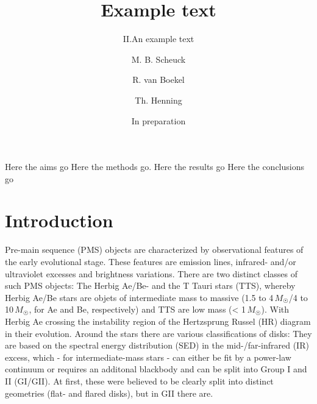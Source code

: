 \documentclass{aa}
\newcommand{\Msun}{\,$M_{\astrosun}$}
\begin{document}
\title{Example text}
\subtitle{II.\@ An example text}
\author{M. B. Scheuck
    \and R. van Boekel
\and Th. Henning}
 \date{In preparation}
\abstract{} {Here the aims go} {Here the methods go.} {Here the results go} {Here the conclusions go}
\maketitle

\section{Introduction}
Pre-main sequence (PMS) objects are characterized by observational features of
the early evolutional stage. These features are emission lines, infrared- and/or
ultraviolet excesses and brightness variations. There are two distinct classes
of such PMS objects: The Herbig Ae/Be- and the T Tauri stars (TTS), whereby
Herbig Ae/Be stars are objets of intermediate mass to massive (1.5 to 4\Msun/4 to
10\Msun, for Ae and Be, respectively) and TTS are low mass (<
1\Msun). With Herbig Ae crossing the instability region of the Hertzsprung Russel
(HR) diagram in their evolution\citet{Zwintz2008}.
Around the stars there are various classifications of disks: They are based on
the spectral energy distribution (SED) in the mid-/far-infrared (IR) excess,
which - for intermediate-mass stars - can either be fit by a power-law
continuum or requires an additonal blackbody and can be split into
Group I and II (GI/GII). At first, these were believed to be clearly
split into distinct geometries (flat- and flared disks), but in GII there are\citet{Garufi2017}.
\end{document}

